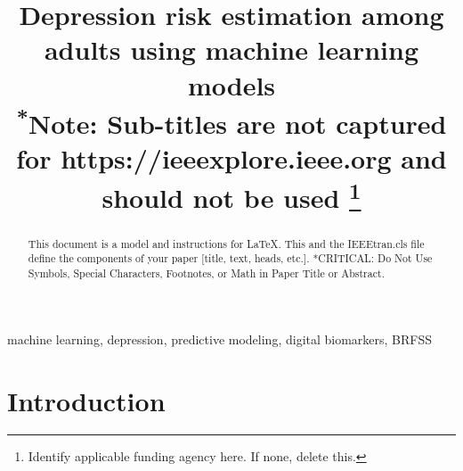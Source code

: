 \documentclass[conference]{IEEEtran}
\begin{document}
\title{Depression risk estimation among adults using machine learning models\\
{\footnotesize \textsuperscript{*}Note: Sub-titles are not captured for https://ieeexplore.ieee.org  and
should not be used}
\thanks{Identify applicable funding agency here. If none, delete this.}
}
\author{
\and
{}
\and
{}
}

\maketitle

\begin{abstract}
This document is a model and instructions for \LaTeX.
This and the IEEEtran.cls file define the components of your paper [title, text, heads, etc.]. *CRITICAL: Do Not Use Symbols, Special Characters, Footnotes, 
or Math in Paper Title or Abstract.
\end{abstract}

\begin{IEEEkeywords}
machine learning, depression, predictive modeling, digital biomarkers, BRFSS
\end{IEEEkeywords}

\section{Introduction}
\end{document}
